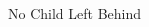 \begin{frame}{No Child Left Behind}
   \begin{columns}[T] %
     \begin{column}{.45\textwidth}
         
     \end{column}%
     \begin{column}{.45\textwidth}
        
     \end{column}%
   \end{columns}
\end{frame}